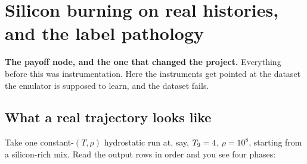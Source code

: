 %
%

\section{Silicon burning on real histories, and the label pathology}
\label{part:pathology}

\textbf{The payoff node, and the one that changed the project.} Everything
before this was instrumentation. Here the instruments get pointed at the
dataset the emulator is supposed to learn, and the dataset fails.

\subsection{What a real trajectory looks like}
\label{sec:realtrajectory}

Take one constant-$(T, \rho)$ hydrostatic run at, say, $T_{9} = 4$,
$\rho = 10^{8}$, starting from a silicon-rich mix. Read the output rows in
order and you see four phases:

